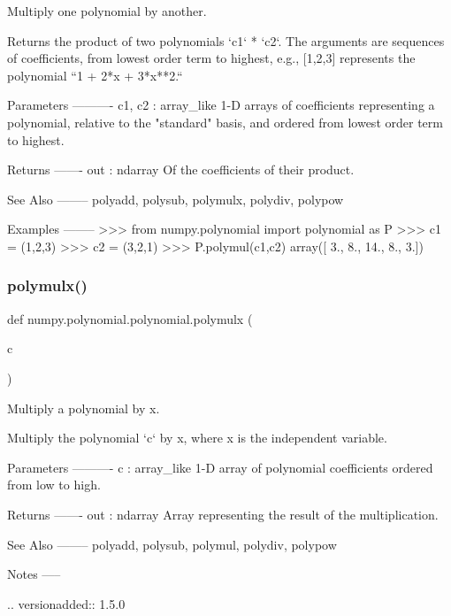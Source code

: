 \begin{DoxyVerb}Multiply one polynomial by another.

Returns the product of two polynomials `c1` * `c2`.  The arguments are
sequences of coefficients, from lowest order term to highest, e.g.,
[1,2,3] represents the polynomial ``1 + 2*x + 3*x**2.``

Parameters
----------
c1, c2 : array_like
    1-D arrays of coefficients representing a polynomial, relative to the
    "standard" basis, and ordered from lowest order term to highest.

Returns
-------
out : ndarray
    Of the coefficients of their product.

See Also
--------
polyadd, polysub, polymulx, polydiv, polypow

Examples
--------
>>> from numpy.polynomial import polynomial as P
>>> c1 = (1,2,3)
>>> c2 = (3,2,1)
>>> P.polymul(c1,c2)
array([  3.,   8.,  14.,   8.,   3.])\end{DoxyVerb}
 \mbox{\label{namespacenumpy_1_1polynomial_1_1polynomial_a41d8832845d385528e43af0cbe1b2ef2}} 
\subsubsection{\texorpdfstring{polymulx()}{polymulx()}}
{\footnotesize\ttfamily def numpy.\+polynomial.\+polynomial.\+polymulx (\begin{DoxyParamCaption}\item[{}]{c }\end{DoxyParamCaption})}

\begin{DoxyVerb}Multiply a polynomial by x.

Multiply the polynomial `c` by x, where x is the independent
variable.


Parameters
----------
c : array_like
    1-D array of polynomial coefficients ordered from low to
    high.

Returns
-------
out : ndarray
    Array representing the result of the multiplication.

See Also
--------
polyadd, polysub, polymul, polydiv, polypow

Notes
-----

.. versionadded:: 1.5.0\end{DoxyVerb}
 \mbox{\label{namespacenumpy_1_1polynomial_1_1polynomial_a2d46be6f41be6b0dd8959c1cf4cc0fc6}} 
